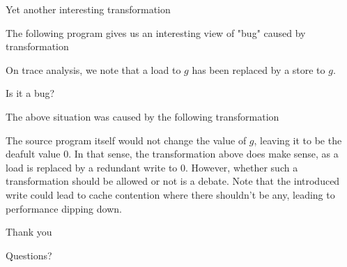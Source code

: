 \documentclass[notes, xcolor=dvipsnames]{beamer}
\begin{document}

    \begin{frame}{Yet another interesting transformation}
        
        The following program gives us an interesting view of "bug" caused by transformation
        \begin{figure}
        \end{figure}

        On trace analysis, we note that a load to $g$ has been replaced by a store to $g$. 
        \begin{figure}
        \end{figure}

    \end{frame}

    \begin{frame}{Is it a bug? }
        
        The above situation was caused by the following transformation
        \begin{figure}
        \end{figure}

        The source program itself would not change the value of $g$, leaving it to be the deafult value $0$.
        In that sense, the transformation above does make sense, as a load is replaced by a redundant write to $0$.
        However, whether such a transformation should be allowed or not is a debate.
        Note that the introduced write could lead to cache contention where there shouldn't be any, leading to performance dipping down.

    \end{frame}


    \begin{frame}{Thank you}

        Questions?

    \end{frame}
\end{document}
